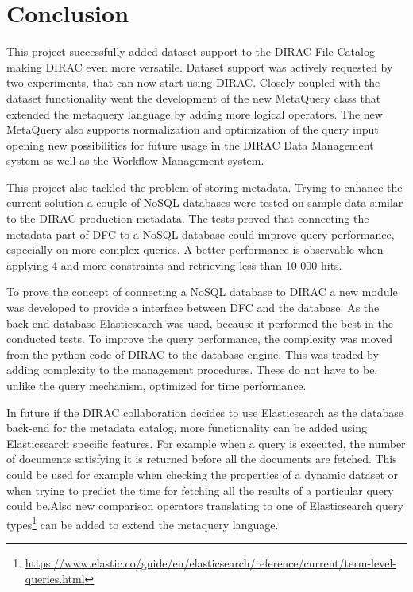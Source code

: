 \chapter*{Conclusion}
\label{chap:conc}

This project successfully added dataset support to the DIRAC File Catalog making DIRAC even more 
versatile. Dataset support was actively requested by two experiments, that can now start using DIRAC. 
Closely coupled with the dataset functionality went the development of the new MetaQuery
class that extended the metaquery language by adding more logical operators. The new MetaQuery also
supports normalization and optimization of the query input opening new possibilities for future usage
in the DIRAC Data Management system as well as the Workflow Management system. 

This project also tackled the problem of storing metadata. Trying to enhance the current solution a couple of NoSQL 
databases were tested on sample data similar to the DIRAC production metadata. The tests proved that connecting the 
metadata part of DFC to a NoSQL database could improve query performance, especially on more complex
queries. A better performance is observable when applying 4 and more constraints and retrieving less than 10 000 
hits.

To prove the concept of connecting a NoSQL database to DIRAC a new module was developed to provide 
a interface between DFC and the database. As the back-end database Elasticsearch was used, because it performed the 
best in the conducted tests. To improve the query performance, the complexity was moved from the python code of
DIRAC to the database engine. This was traded by adding complexity to the management procedures. These do not have 
to be, unlike the query mechanism, optimized for time performance.

In future if the DIRAC collaboration decides to use Elasticsearch as the database back-end for the metadata
catalog, more functionality can be added using Elasticsearch specific features. 
For example when a query is executed, the number of documents satisfying it is returned before all the documents are 
fetched. This could be used for example when checking the properties of a dynamic dataset or when trying to predict
the time for fetching all the results of a particular query could be.Also new comparison 
operators translating to one of Elasticsearch query 
types\footnote{\url{https://www.elastic.co/guide/en/elasticsearch/reference/current/term-level-queries.html}} can be 
added to extend the metaquery language.